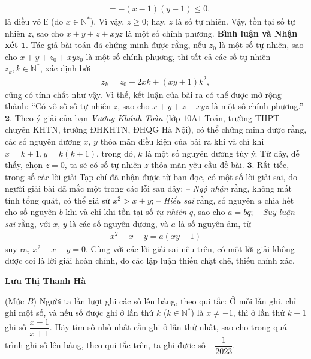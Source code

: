\begin{multicols}{2}
\begin{align*}
		&= - \left( {x - 1} \right)\left( {y - 1} \right) \le 0,
	\end{align*}
	là điều vô lí (do  $x \in \mathbb{N^*}$).
	\vskip 0.05cm
	Vì vậy, $z \ge 0$; hay, $z$ là số tự nhiên.
	\vskip 0.05cm
	Vậy, tồn tại số tự nhiên $z$, sao cho $x + y + z + xyz$ là một số chính phương.
	\vskip 0.05cm
	\textbf{\color{thachthuctoanhoc}Bình luận và Nhận xét}
	\vskip 0.05cm
	$\pmb{1.}$ Tác giả bài toán đã chứng minh được rằng, nếu $z_0$  là một số tự nhiên, sao cho $x + y + z_0 + xyz_0$  là một số chính phương, thì tất cả các số tự nhiên $z_k, k \in \mathbb{N^*}$, xác định bởi
	\begin{align*}
		{z_k} = {z_0} + 2xk + \left( {xy + 1} \right){k^2},
	\end{align*}
	cũng có tính chất như vậy. Vì thế, kết luận của bài ra có thể được mở rộng thành: “Có vô số số tự nhiên $z$, sao cho $x + y + z + xyz$ là một số chính phương.”
	\vskip 0.05cm
	$\pmb{2.}$ Theo ý giải của bạn \textit{Vương Khánh Toàn} (lớp $10$A$1$ Toán, trường THPT chuyên KHTN, trường ĐHKHTN, ĐHQG Hà Nội), có thể chứng minh được rằng, các số nguyên dương $x$, $y$ thỏa mãn điều kiện của bài ra khi và chỉ khi $x = k + 1, y = k(k + 1)$, trong đó, $k$ là một số nguyên dương tùy ý. Từ đây, dễ thấy, chọn $z = 0$, ta sẽ có số tự nhiên $z$ thỏa mãn yêu cầu đề bài.
	\vskip 0.05cm
	$\pmb{3.}$ Rất tiếc, trong số các lời giải Tạp chí đã nhận được từ bạn đọc, có một số lời giải sai, do người giải bài đã mắc một trong các lỗi sau đây:
	\vskip 0.05cm
	-- \textit{Ngộ nhận} rằng, không mất tính tổng quát, có thể giả sử $x^2 > x + y$;
	\vskip 0.05cm 
	-- \textit{Hiểu sai} rằng, số nguyên $a$ chia hết cho số nguyên $b$ khi và chỉ khi tồn tại số \textit{tự nhiên} $q$, sao cho $a = bq$;
	\vskip 0.05cm
	--\textit{ Suy luận sai} rằng, với $x$, $y$ là các số nguyên dương, và $a$ là số nguyên âm, từ
	\begin{align*}
		{x^2} - x - y = a\left( {xy + 1} \right)
	\end{align*}
	suy ra, $x^2 - x - y = 0$.
	\vskip 0.05cm  
	Cùng với các lời giải sai nêu trên, có một lời giải không được coi là lời giải hoàn chỉnh, do các lập luận thiếu chặt chẽ, thiếu chính xác.
	\begin{flushright}
		\textbf{\color{thachthuctoanhoc}Lưu Thị Thanh Hà}
	\end{flushright}
	{}
	(Mức $B$)
	Người ta lần lượt ghi các số lên bảng, theo qui tắc: Ở mỗi lần ghi, chỉ ghi một số, và nếu số được ghi ở lần thứ $k$ ($k \in \mathbb{N^*}$) là $x \ne -1$,  thì ở lần thứ $k + 1$ ghi số $\dfrac{x-1}{x+1}$. Hãy tìm số nhỏ nhất cần ghi ở lần thứ nhất, sao cho trong quá trình ghi số lên bảng, theo qui tắc trên, ta ghi được số $-\dfrac{1}{2023}$.

\end{multicols}
